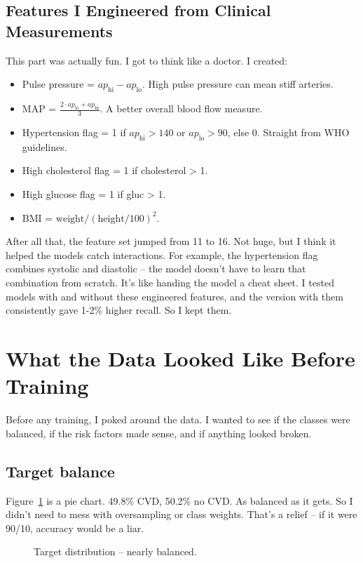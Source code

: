 \documentclass[12pt, a4paper, oneside]{book}
\begin{document}
\subsection{Features I Engineered from Clinical Measurements}
This part was actually fun. I got to think like a doctor. I created:

\begin{itemize}
  \item Pulse pressure = $ap_{\text{hi}} - ap_{\text{lo}}$. High pulse pressure can mean stiff arteries.
  \item MAP = $\frac{2 \cdot ap_{\text{lo}} + ap_{\text{hi}}}{3}$. A better overall blood flow measure.
  \item Hypertension flag = 1 if $ap_{\text{hi}} > 140$ or $ap_{\text{lo}} > 90$, else 0. Straight from WHO guidelines.
  \item High cholesterol flag = 1 if cholesterol > 1.
  \item High glucose flag = 1 if gluc > 1.
  \item BMI = $\text{weight} / (\text{height}/100)^2$.
\end{itemize}

After all that, the feature set jumped from 11 to 16. Not huge, but I think it helped the models catch interactions. For example, the hypertension flag combines systolic and diastolic – the model doesn't have to learn that combination from scratch. It's like handing the model a cheat sheet. I tested models with and without these engineered features, and the version with them consistently gave 1-2\% higher recall. So I kept them.

\section{What the Data Looked Like Before Training}
Before any training, I poked around the data. I wanted to see if the classes were balanced, if the risk factors made sense, and if anything looked broken.

\subsection{Target balance}
Figure~\ref{fig:target_pie} is a pie chart. 49.8\% CVD, 50.2\% no CVD. As balanced as it gets. So I didn't need to mess with oversampling or class weights. That's a relief – if it were 90/10, accuracy would be a liar.

\begin{figure}[H]
\centering
{}
\caption{Target distribution – nearly balanced.}
\label{fig:target_pie}
\end{figure}
\end{document}
